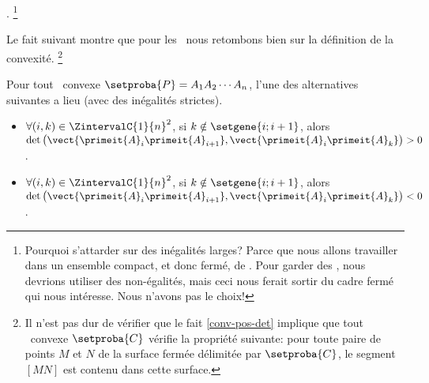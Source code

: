 






\newpage

.%
\footnote{
    Pourquoi s'attarder sur des inégalités larges? Parce que nous allons travailler dans un ensemble compact, et donc fermé, de \ncycles.
    Pour garder des \ngones, nous devrions utiliser des non-égalités, mais ceci nous ferait sortir du cadre fermé qui nous intéresse.
    Nous n'avons pas le choix!
}

Le fait suivant montre que pour les \ngones\ nous retombons bien sur la définition  de la convexité.%
\footnote{
     Il n'est pas dur de vérifier que le fait \ref{conv-pos-det} implique que tout \ngone\ convexe $\setproba{C}$ vérifie la propriété suivante:
     pour toute paire de points $M$ et $N$ de la surface fermée  délimitée par $\setproba{C}$, le segment $[MN]$ est contenu dans cette surface.
}


\begin{fact} \label{conv-pos-det}
    Pour tout \ngone\ convexe $\setproba{P} = A_1 A_2 \cdots A_n$, l'une des alternatives suivantes a lieu (avec des inégalités strictes).
	\begin{itemize}
		\item $\forall (i, k) \in \ZintervalC{1}{n}^2$,
		si $k \notin \setgene{i ; i+1}$, alors
		$\det \big( \vect{\primeit{A}_i \primeit{A}_{i+1}}, \vect{\primeit{A}_i \primeit{A}_k} \big) > 0$.

		\item $\forall (i, k) \in \ZintervalC{1}{n}^2$,
		si $k \notin \setgene{i ; i+1}$, alors
		$\det \big( \vect{\primeit{A}_i \primeit{A}_{i+1}}, \vect{\primeit{A}_i \primeit{A}_k} \big) < 0$.
    \end{itemize}
\end{fact}


